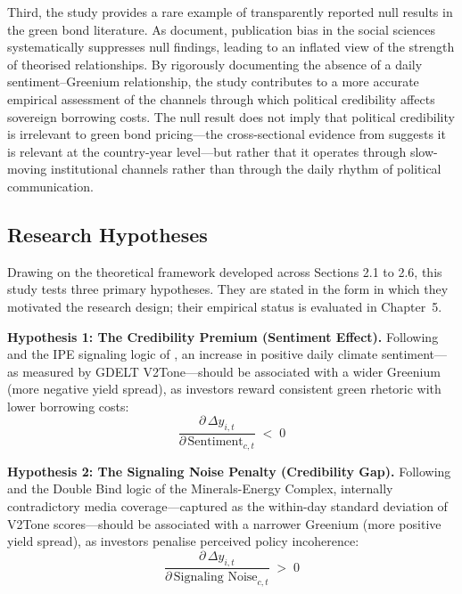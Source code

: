 \documentclass[12pt,a4paper]{article}
\begin{document}
Third, the study provides a rare example of transparently reported null results in the green bond literature. As \citet{Franco2014} document, publication bias in the social sciences systematically suppresses null findings, leading to an inflated view of the strength of theorised relationships. By rigorously documenting the absence of a daily sentiment--Greenium relationship, the study contributes to a more accurate empirical assessment of the channels through which political credibility affects sovereign borrowing costs. The null result does not imply that political credibility is irrelevant to green bond pricing---the cross-sectional evidence from \citet{Lau2024} suggests it is relevant at the country-year level---but rather that it operates through slow-moving institutional channels rather than through the daily rhythm of political communication.


\subsection{Research Hypotheses}

Drawing on the theoretical framework developed across Sections 2.1 to 2.6, this study tests three primary hypotheses. They are stated in the form in which they motivated the research design; their empirical status is evaluated in Chapter~5.

\vspace{0.5em}
\noindent\textbf{Hypothesis 1: The Credibility Premium (Sentiment Effect).}
Following \citet{Lau2024} and the IPE signaling logic of \citet{Gabor2021}, an increase in positive daily climate sentiment---as measured by GDELT V2Tone---should be associated with a wider Greenium (more negative yield spread), as investors reward consistent green rhetoric with lower borrowing costs:
\begin{equation}
\frac{\partial\,\Delta y_{i,t}}{\partial\,\text{Sentiment}_{c,t}} \;<\; 0
\end{equation}

\vspace{0.3em}
\noindent\textbf{Hypothesis 2: The Signaling Noise Penalty (Credibility Gap).}
Following \citet{Neumann2025} and the Double Bind logic of the Minerals-Energy Complex, internally contradictory media coverage---captured as the within-day standard deviation of V2Tone scores---should be associated with a narrower Greenium (more positive yield spread), as investors penalise perceived policy incoherence:
\begin{equation}
\frac{\partial\,\Delta y_{i,t}}{\partial\,\text{Signaling Noise}_{c,t}} \;>\; 0
\end{equation}
\end{document}
